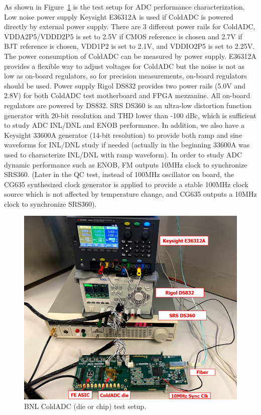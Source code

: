 As shown in Figure~\ref{fig:bnl_testsetup} is the test setup for ADC performance characterization. Low noise power supply Keysight E36312A is used if ColdADC is powered directly by external power supply. There are 3 different power rails for ColdADC, VDDA2P5/VDDD2P5 is set to 2.5V if CMOS reference is chosen and 2.7V if BJT reference is chosen, VDD1P2 is set to 2.1V, and VDDIO2P5 is set to 2.25V. The power consumption of ColdADC can be measured by power supply. E36312A provides a flexible way to adjust voltages for ColdADC but the noise is not as low as on-board regulators, so for precision measurements, on-board regulators should be used. Power supply Rigol DS832 provides two power rails (5.0V and 2.8V) for both ColdADC test motherboard and FPGA mezzanine. All on-board regulators are powered by DS832. SRS DS360 is an ultra-low distortion function generator with 20-bit resolution and THD lower than -100 dBc, which is sufficient to study ADC INL/DNL and ENOB performance. In addition, we also have a Keysight 33600A generator (14-bit resolution) to provide both ramp and sine waveforms for INL/DNL study if needed (actually in the beginning 33600A was used to characterize INL/DNL with ramp waveform). In order to study ADC dynamic performance such as ENOB, FM outputs 10MHz clock to synchronize SRS360. (Later in the QC test, instead of 100MHz oscillator on board, the CG635 synthesized clock generator is applied to provide a stable 100MHz clock source which is not affected by temperature change, and CG635 outputs a 10MHz clock to synchronize SRS360). 
\begin{figure}[!ht]
\centering
 \includegraphics[width=0.75\linewidth]{figures/BNL_testsetup.png}
  \caption{BNL ColdADC (die or chip) test setup.}
  \label{fig:bnl_testsetup}
\end{figure}
